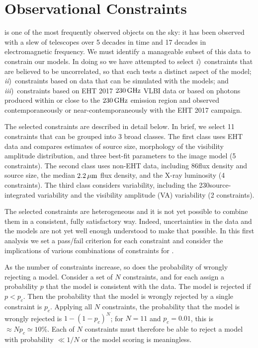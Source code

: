 \section{Observational Constraints}\label{sec:observations}

\sgra is one of the most frequently observed objects on the sky: it has been observed with a slew of telescopes over 5 decades in time and 17 decades in electromagnetic frequency. We must identify a manageable subset of this data to constrain our models. In doing so we have attempted to select
\emph{i})~constraints that are believed to be uncorrelated, so that each tests a distinct aspect of the model;
\emph{ii})~constraints based on data that can be simulated with the models; and
\emph{iii})~constraints based on EHT 2017 $230\,\mathrm{GHz}$ VLBI data or based on photons produced within or close to the $230\,\mathrm{GHz}$ emission region and observed contemporaneously or near-contemporaneously with the EHT 2017 campaign.

The selected constraints are described in detail below.  In brief, we select 11 constraints that can be grouped into 3 broad classes.  The first class uses EHT data and compares estimates of source size, morphology of the visibility amplitude distribution, and three best-fit parameters to the \mring image model (5 constraints).  The second class uses non-EHT data, including 86\GHz flux density and source size, the median $2.2\,\mu\mathrm{m}$ flux density, and the X-ray luminosity (4 constraints).  The third class considers variability, including the 230\GHz source-integrated variability and the visibility amplitude (VA) variability (2 constraints).

The selected constraints are heterogeneous and it is not yet possible to combine them in a consistent, fully satisfactory way.  Indeed, uncertainties in the data and the models are not yet well enough understood to make that possible.  In this first analysis we set a pass/fail criterion for each constraint and consider the implications of various combinations of constraints for \sgra.

As the number of constraints increase, so does the probability of wrongly rejecting a model.  Consider a set of $N$ constraints, and for each assign a probability $p$ that the model is consistent with the data.  The model is rejected if $p < p_c$.  Then the probability that the model is wrongly rejected by a single constraint is $p_c$.  Applying all $N$ constraints, the probability that the model is wrongly rejected is $1 - (1 - p_c)^N$; for $N = 11$ and $p_c = 0.01$, this is $\approx N p_c \simeq 10\%$.  Each of $N$ constraints  must therefore be able to reject a model with probability $\ll 1/N$ or the model scoring is meaningless.

